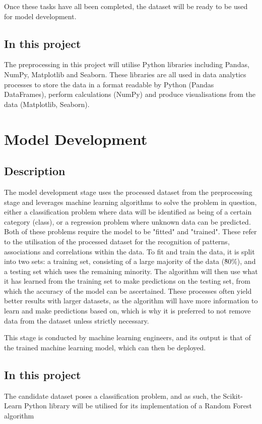\documentclass[12pt]{report}
\begin{document}
Once these tasks have all been completed, the dataset will be ready to be used for model development.

\subsection{In this project}
The preprocessing in this project will utilise Python libraries including Pandas, NumPy, Matplotlib 
and Seaborn. These libraries are all used in data analytics processes to store the data in a format
readable by Python (Pandas DataFrames), perform calculations (NumPy) and produce visualisations from the 
data (Matplotlib, Seaborn).

\section{Model Development}
\subsection{Description}
The model development stage uses the processed dataset from the preprocessing stage and leverages 
machine learning algorithms to solve the problem in question, either a classification problem where 
data will be identified as being of a certain category (class), or a regression problem where unknown 
data can be predicted. Both of these problems require the model to be "fitted" and "trained".
These refer to the utilisation of the processed dataset for the recognition of patterns, 
associations and correlations within the data. To fit and train the data, it is split into two sets:
a training set, consisting of a large majority of the data (\~80\%), and a testing set which uses the 
remaining minority. The algorithm will then use what it has learned from the training set to make predictions 
on the testing set, from which the accuracy of the model can be ascertained. These processes often yield better
results with larger datasets, as the algorithm will have more information to learn and make predictions based on,
which is why it is preferred to not remove data from the dataset unless strictly necessary.

This stage is conducted by machine learning engineers, and its output is that of the trained machine learning 
model, which can then be deployed.


\subsection{In this project}
The candidate dataset poses a classification problem, and as such, the Scikit-Learn Python library 
will be utilised for its implementation of a Random Forest algorithm
\end{document}

